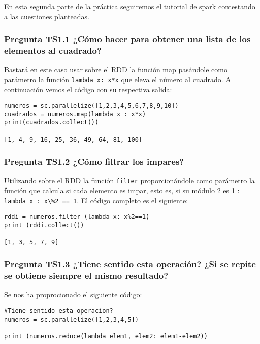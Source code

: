 \documentclass[11pt]{article}
\def\inline{\lstinline[basicstyle=\ttfamily,keywordstyle={}]}
\begin{document}
En esta segunda parte de la práctica seguiremos el tutorial de spark contestando a las cuestiones planteadas.


\subsubsection*{ Pregunta TS1.1 ¿Cómo hacer para obtener una lista de los elementos al cuadrado?}

Bastará en este caso usar sobre el RDD la función map pasándole como parámetro la función \inline{lambda x: x*x} que eleva el número al cuadrado. 
A continuación vemos el código con su respectiva salida:

\begin{verbatim}
numeros = sc.parallelize([1,2,3,4,5,6,7,8,9,10])
cuadrados = numeros.map(lambda x : x*x)
print(cuadrados.collect())

[1, 4, 9, 16, 25, 36, 49, 64, 81, 100]
\end{verbatim}

\subsubsection*{ Pregunta TS1.2 ¿Cómo filtrar los impares? }

Utilizando sobre el RDD la función \inline{filter} proporcionándole como parámetro la función que calcula si cada elemento es impar, esto es, si su módulo 2 es 1 : \inline{lambda x : x\%2 == 1}. El código completo es el siguiente:

\begin{verbatim}
rddi = numeros.filter (lambda x: x%2==1)
print (rddi.collect())

[1, 3, 5, 7, 9]
\end{verbatim}

\subsubsection*{ Pregunta TS1.3 ¿Tiene sentido esta operación? ¿Si se repite se obtiene siempre el mismo resultado?}

Se nos ha proprocionado el siguiente código:

\begin{verbatim}
#Tiene sentido esta operacion?
numeros = sc.parallelize([1,2,3,4,5])

print (numeros.reduce(lambda elem1, elem2: elem1-elem2))
\end{verbatim}
\end{document}
